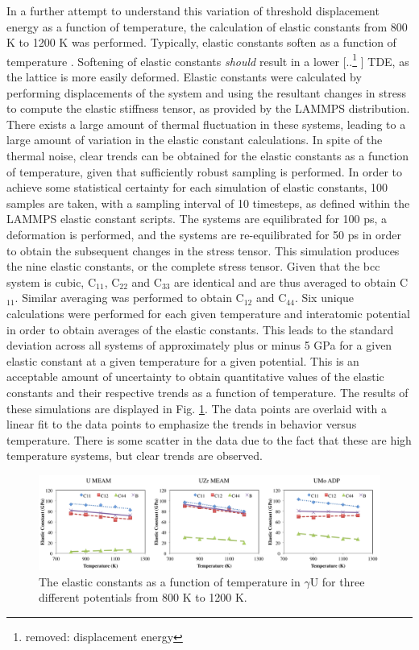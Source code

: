 \documentclass[review]{elsarticle}
\providecommand{\DIFaddtex}[1]{{\protect\color{blue} \sf #1}} %
\providecommand{\DIFdeltex}[1]{{\protect\color{red} [..\footnote{removed: #1} ]}} %
\providecommand{\DIFaddbegin}{} %
\providecommand{\DIFaddend}{} %
\providecommand{\DIFdelbegin}{} %
\providecommand{\DIFdelend}{} %
\providecommand{\DIFaddFL}[1]{\DIFadd{#1}} %
\providecommand{\DIFadd}[1]{\texorpdfstring{\DIFaddtex{#1}}{#1}} %
\providecommand{\DIFdel}[1]{\texorpdfstring{\DIFdeltex{#1}}{}} %
\newcommand{\DIFscaledelfig}{0.5}
\newlength{\DIFdelgraphicswidth} %
\newlength{\DIFdelgraphicsheight} %
\newcommand{\DIFaddincludegraphics}[2][]{{\color{blue}\fbox{\DIFOincludegraphics[#1]{#2}}}} %
\newcommand{\DIFdelincludegraphics}[2][]{%
\sbox{\DIFdelgraphicsbox}{\DIFOincludegraphics[#1]{#2}}%
\settoboxwidth{\DIFdelgraphicswidth}{\DIFdelgraphicsbox} %
\settoboxtotalheight{\DIFdelgraphicsheight}{\DIFdelgraphicsbox} %
\scalebox{\DIFscaledelfig}{%
\parbox[b]{\DIFdelgraphicswidth}{\usebox{\DIFdelgraphicsbox}\\[-\baselineskip] \rule{\DIFdelgraphicswidth}{0em}}\llap{\resizebox{\DIFdelgraphicswidth}{\DIFdelgraphicsheight}{%
\setlength{\unitlength}{\DIFdelgraphicswidth}%
\begin{picture}(1,1)%
\thicklines\linethickness{2pt} %
{\color[rgb]{1,0,0}\put(0,0){\framebox(1,1){}}}%
{\color[rgb]{1,0,0}\put(0,0){\line( 1,1){1}}}%
{\color[rgb]{1,0,0}\put(0,1){\line(1,-1){1}}}%
\end{picture}%
}\hspace*{3pt}}} %
} %
\DeclareRobustCommand{\DIFaddbegin}{\DIFOaddbegin \let\includegraphics\DIFaddincludegraphics} %
\DeclareRobustCommand{\DIFaddend}{\DIFOaddend \let\includegraphics\DIFOincludegraphics} %
\DeclareRobustCommand{\DIFdelbegin}{\DIFOdelbegin \let\includegraphics\DIFdelincludegraphics} %
\DeclareRobustCommand{\DIFdelend}{\DIFOaddend \let\includegraphics\DIFOincludegraphics} %
\begin{document}
In a further attempt to understand this variation of \DIFaddbegin \DIFadd{threshold }\DIFaddend displacement energy as a function of temperature, the calculation of elastic constants from 800 K to 1200 K was performed. Typically, elastic constants soften as a function of temperature \cite{varshni1970}. Softening of elastic constants \textit{should} result in a lower \DIFdelbegin \DIFdel{displacement energy}\DIFdelend \DIFaddbegin \DIFadd{TDE}\DIFaddend , as the lattice is more easily deformed. Elastic constants were calculated by performing displacements of the system and using the resultant changes in stress to compute the elastic stiffness tensor, as provided by the LAMMPS distribution. There exists a large amount of thermal fluctuation in these systems, leading to a large amount of variation in the elastic constant calculations. In spite of the thermal noise, clear trends can be obtained for the elastic constants as a function of temperature, given that sufficiently robust sampling is performed. In order to achieve some statistical certainty for each simulation of elastic constants, 100 samples are taken, with a sampling interval of 10 timesteps, as defined within the LAMMPS elastic constant scripts. The systems are equilibrated for 100 ps, a deformation is performed, and the systems are re-equilibrated for 50 ps in order to obtain the subsequent changes in the stress tensor. This simulation produces the nine elastic constants, or the complete stress tensor. Given that the bcc system is cubic, C$_{11}$, C$_{22}$ and C$_{33}$ are identical and are thus averaged to obtain C$_{11}$. Similar averaging was performed to obtain C$_{12}$ and C$_{44}$. Six unique calculations were performed for each given temperature and interatomic potential in order to obtain averages of the elastic constants. This leads to the standard deviation across all systems of approximately plus or minus 5 GPa for a given elastic constant at a given temperature for a given potential. This is an acceptable amount of uncertainty to obtain quantitative values of the elastic constants and their respective trends as a function of temperature. The results of these simulations are displayed in Fig. \ref{fig:elastic}. The data points are overlaid with a linear fit to the data points to emphasize the trends in behavior versus temperature. There is some scatter in the data due to the fact that these are high temperature systems, but clear trends are observed. 

\DIFaddbegin \begin{figure}[h]
 \centering
 \includegraphics[width=\textwidth]{elastic_vs_T.png} 
 \caption{\DIFaddFL{The elastic constants as a function of temperature in $\gamma$U for three different potentials from 800 K to 1200 K.}}
 \label{fig:elastic}
\end{figure}
\end{document}
